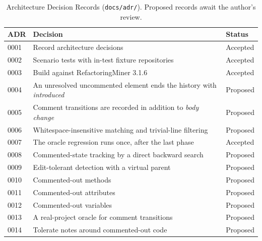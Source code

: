 \documentclass[11pt,a4paper]{article}
\newcommand{\code}[1]{\texttt{#1}}
\newcommand{\change}[1]{\textit{#1}}
\begin{document}
\begin{table}[h]
\centering\small
\caption{Architecture Decision Records (\code{docs/adr/}). Proposed records await the author's review.}
\begin{tabular}{@{}lll@{}}
\toprule
ADR & Decision & Status \\
\midrule
0001 & Record architecture decisions & Accepted \\
0002 & Scenario tests with in-test fixture repositories & Accepted \\
0003 & Build against RefactoringMiner 3.1.6 & Accepted \\
0004 & An unresolved uncommented element ends the history with \change{introduced} & Proposed \\
0005 & Comment transitions are recorded in addition to \change{body change} & Proposed \\
0006 & Whitespace-insensitive matching and trivial-line filtering & Proposed \\
0007 & The oracle regression runs once, after the last phase & Accepted \\
0008 & Commented-state tracking by a direct backward search & Proposed \\
0009 & Edit-tolerant detection with a virtual parent & Proposed \\
0010 & Commented-out methods & Proposed \\
0011 & Commented-out attributes & Proposed \\
0012 & Commented-out variables & Proposed \\
0013 & A real-project oracle for comment transitions & Proposed \\
0014 & Tolerate notes around commented-out code & Proposed \\
\bottomrule
\end{tabular}
\end{table}
\end{document}
